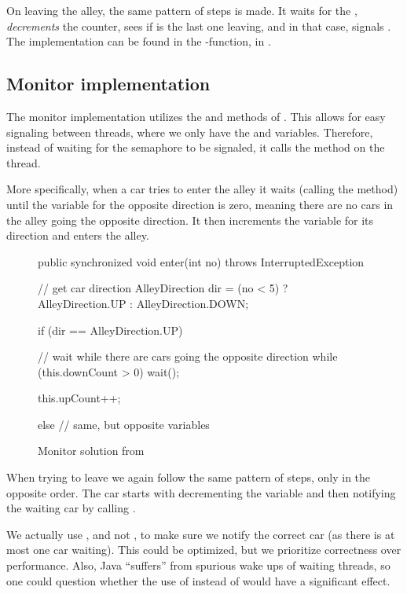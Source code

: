 On leaving the alley, the same pattern of steps is made. It waits for
the , \emph{decrements} the counter, sees if is the last
one leaving, and in that case, signals . The
implementation can be found in the -function, in
.


\subsection{Monitor implementation}
\label{sub:all-moni}
The monitor implementation utilizes the  and 
methods of . This allows for easy signaling
between threads, where we only have the  and
 variables. Therefore, instead of waiting for the
semaphore to be signaled, it calls the  method on the
thread.

More specifically, when a car tries to enter the alley it waits
(calling the  method) until the  variable for
the opposite direction is zero, meaning there are no cars in the alley
going the opposite direction. It then increments the 
variable for its direction and enters the alley.

\begin{figure}[H]
\label{lst:all-mon}
  \begin{java}
public synchronized void enter(int no) throws InterruptedException {
    // get car direction
    AlleyDirection dir = (no < 5) ? AlleyDirection.UP : AlleyDirection.DOWN;

    if (dir == AlleyDirection.UP) {
        // wait while there are cars going the opposite direction
        while (this.downCount > 0)
            wait();

        this.upCount++;

    } else {
        // same, but opposite variables
    }
}
  \end{java}
  \caption{Monitor solution from }
\end{figure}

When trying to leave we again follow the same pattern of steps, only
in the opposite order. The car starts with decrementing the
 variable and then notifying the waiting car by calling
.

We actually use , and not , to make sure
we notify the correct car (as there is at most one car waiting). This
could be optimized, but we prioritize correctness over
performance. Also, Java ``suffers'' from spurious wake ups of waiting
threads, so one could question whether the use of 
instead of  would have a significant effect.

